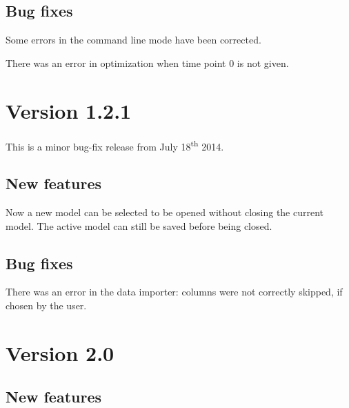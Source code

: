\subsection{Bug fixes}
\begin{dinglist}{54}
\item Some errors in the command line mode have been corrected.
\item There was an error in optimization when time point 0 is not given.
\end{dinglist}

\section{Version 1.2.1}

This is a minor bug-fix release from July 18\textsuperscript{th} 2014.

\subsection{New features}

\begin{dinglist}{52}
\item Now a new model can be selected to be opened without closing the current model.
      The active model can still be saved before being closed.
\end{dinglist}


\subsection{Bug fixes}
\begin{dinglist}{54}
\item There was an error in the data importer:
      columns were not correctly skipped, if chosen by the user.
\end{dinglist}



\section{Version 2.0}

\subsection{New features}

